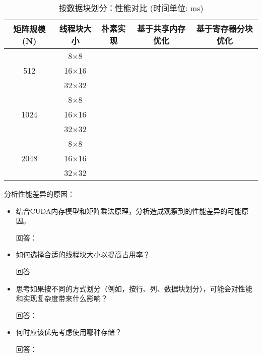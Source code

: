 \documentclass{SYSUReport}
\begin{document}
\begin{table}[H] %
\centering
\caption{按数据块划分：性能对比 (时间单位: ms)}
\label{tab:perf_combined}
\begin{tabular}{|c|c|c|c|c|}
\hline
矩阵规模 (N) & 线程块大小 & 朴素实现 & 基于共享内存优化 & 基于寄存器分块优化 \\
\hline
\multirow{3}{*}{512} & 8$\times$8 &       &       &       \\ %
\cline{2-5}
& 16$\times$16 &       &       &       \\
\cline{2-5}
& 32$\times$32 &       &       &       \\
\hline
\multirow{3}{*}{1024} & 8$\times$8 &       &       &       \\
\cline{2-5}
& 16$\times$16 &       &       &       \\
\cline{2-5}
& 32$\times$32 &       &       &       \\
\hline
\multirow{3}{*}{2048} & 8$\times$8 &       &       &       \\
\cline{2-5}
& 16$\times$16 &       &       &       \\
\cline{2-5}
& 32$\times$32 &       &       &       \\
\hline
\end{tabular}
\end{table}
分析性能差异的原因：
\begin{itemize}
    \item 结合CUDA内存模型和矩阵乘法原理，分析造成观察到的性能差异的可能原因。\par
    回答：
    \item 如何选择合适的线程块大小以提高占用率？\par
    回答
    \item 思考如果按不同的方式划分（例如，按行、列、数据块划分），可能会对性能和实现复杂度带来什么影响？\par
    回答：
    \item 何时应该优先考虑使用哪种存储？\par
    回答：


\end{itemize}
\end{document}
